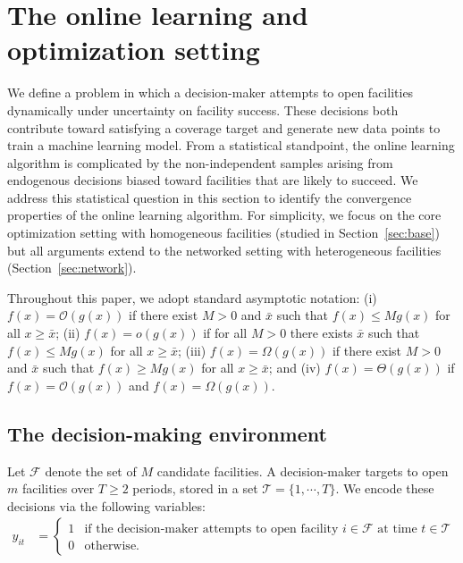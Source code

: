 \documentclass[nonblindrev]{informs3noheader}
\def\calF{\mathcal{F}}
\def\calO{\mathcal{O}}
\def\calT{\mathcal{T}}
\begin{document}
\section{The online learning and optimization setting}
\label{sec:setting}

We define a problem in which a decision-maker attempts to open facilities dynamically under uncertainty on facility success. These decisions both contribute toward satisfying a coverage target and generate new data points to train a machine learning model. From a statistical standpoint, the online learning algorithm is complicated by the non-independent samples arising from endogenous decisions biased toward facilities that are likely to succeed. We address this statistical question in this section to identify the convergence properties of the online learning algorithm. For simplicity, we focus on the core optimization setting with homogeneous facilities (studied in Section~\ref{sec:base}) but all arguments extend to the networked setting with heterogeneous facilities (Section~\ref{sec:network}).

Throughout this paper, we adopt standard asymptotic notation: (i) $f(x)=\calO(g(x))$ if there exist $M>0$ and $\bar{x}$ such that $f(x)\leq Mg(x)$ for all $x\geq\bar{x}$; (ii) $f(x)=o(g(x))$ if for all $M>0$ there exists $\bar{x}$ such that $f(x)\leq Mg(x)$ for all $x\geq\bar{x}$; (iii) $f(x)=\Omega(g(x))$ if there exist $M>0$ and $\bar{x}$ such that $f(x)\geq Mg(x)$ for all $x\geq\bar{x}$; and (iv) $f(x)=\Theta(g(x))$ if $f(x)=\calO(g(x))$ and $f(x)=\Omega(g(x))$.

\subsection{The decision-making environment}

Let $\calF$ denote the set of $M$ candidate facilities. A decision-maker targets to open $m$ facilities over $T\geq 2$ periods, stored in a set $\calT=\{1,\cdots,T\}$. We encode these decisions via the following variables:
\begin{align*}
    y_{it}&=\begin{cases}
        1&\text{if the decision-maker attempts to open facility $i\in\calF$ at time $t\in\calT$}\\
        0&\text{otherwise.}
    \end{cases}
\end{align*}
\end{document}
